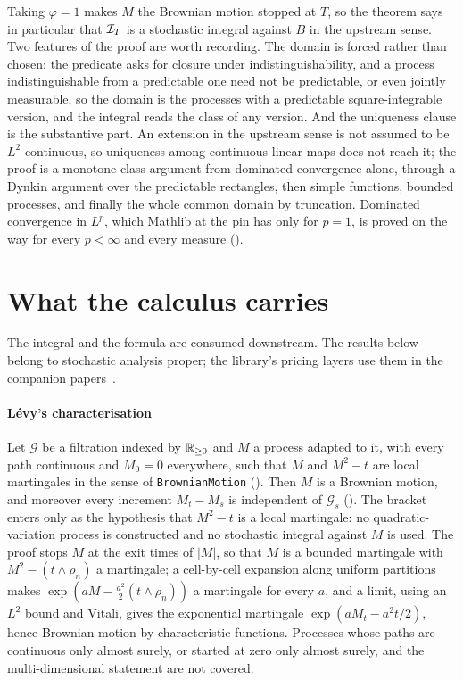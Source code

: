 \documentclass[11pt]{article}
\begin{document}
Taking $\varphi=1$ makes $M$ the Brownian motion stopped at $T$, so the theorem says in particular that $\mathcal{I}_T$ is a
stochastic integral against $B$ in the upstream sense. Two features of the proof are worth recording. The domain is forced
rather than chosen: the predicate asks for closure under indistinguishability, and a process indistinguishable
from a predictable one need not be predictable, or even jointly measurable, so the domain is the processes with a
predictable square-integrable version, and the integral reads the class of any version. And the uniqueness clause is
the substantive part. An extension in the upstream sense is not assumed to be $L^2$-continuous, so uniqueness among
continuous linear maps does not reach it; the proof is a monotone-class argument from dominated convergence alone,
through a Dynkin argument over the predictable rectangles, then simple functions, bounded processes, and finally the
whole common domain by truncation. Dominated convergence in $L^p$, which Mathlib at the pin has only for $p=1$, is
proved on the way for every $p<\infty$ and every measure ().

\section{What the calculus carries}\label{sec:consumers}

The integral and the formula are consumed downstream. The results below belong to stochastic analysis proper; the
library's pricing layers use them in the companion papers~\cite{CoelhoLibrary,CoelhoFTAP}.

\paragraph{L\'evy's characterisation}
Let $\mathcal G$ be a filtration indexed by $\mathbb{R}_{\ge0}$ and $M$ a process adapted to it, with every path continuous
and $M_0=0$ everywhere, such that $M$ and $M^2-t$ are local martingales in the sense of \texttt{BrownianMotion}
(). Then $M$ is a Brownian motion, and moreover every increment $M_t-M_s$ is
independent of $\mathcal G_s$ (). The bracket enters only as the
hypothesis that $M^2-t$ is a local martingale: no quadratic-variation process is constructed and no stochastic
integral against $M$ is used.
The proof stops $M$ at the exit times of $|M|$, so that $M$ is a bounded martingale with $M^2-(t\wedge\rho_n)$ a
martingale; a cell-by-cell expansion along uniform partitions makes $\exp(aM-\frac{a^2}{2}(t\wedge\rho_n))$ a
martingale for every $a$, and a limit, using an $L^2$ bound and Vitali, gives the exponential martingale
$\exp(aM_t-a^2t/2)$, hence Brownian motion by characteristic functions. Processes whose paths are continuous only
almost surely, or started at zero only almost surely, and the multi-dimensional statement are not covered.
\end{document}
